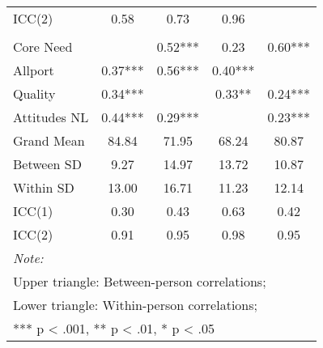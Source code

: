 \begin{table}
\begin{minipage}[t][\textheight][t]{\textwidth}
{\begin{tabular}[t]{lcccc}
\hspace{1em}ICC(2) & 0.58 & 0.73 & 0.96 & \\
\addlinespace[0.3em]
\multicolumn{5}{l}{\textbf{Study 3}}\\
\hspace{1em}Core Need &  & 0.52*** & 0.23 & 0.60***\\
\hspace{1em}Allport & 0.37*** & 0.56*** & 0.40*** & \\
\hspace{1em}Quality & 0.34*** &  & 0.33** & 0.24***\\
\hspace{1em}Attitudes NL & 0.44*** & 0.29*** &  & 0.23***\\
\addlinespace
\hspace{1em}Grand Mean & 84.84 & 71.95 & 68.24 & 80.87\\
\hspace{1em}Between SD & 9.27 & 14.97 & 13.72 & 10.87\\
\hspace{1em}Within SD & 13.00 & 16.71 & 11.23 & 12.14\\
\hspace{1em}ICC(1) & 0.30 & 0.43 & 0.63 & 0.42\\
\hspace{1em}ICC(2) & 0.91 & 0.95 & 0.98 & 0.95\\
\bottomrule
\multicolumn{5}{l}{\rule{0pt}{1em}\textit{Note: }}\\
\multicolumn{5}{l}{\rule{0pt}{1em}Upper triangle: Between-person correlations;}\\
\multicolumn{5}{l}{\rule{0pt}{1em}Lower triangle: Within-person correlations;}\\
\multicolumn{5}{l}{\rule{0pt}{1em}*** p < .001, ** p < .01,  * p < .05}\\
\end{tabular}}
\end{minipage}
\end{table}
